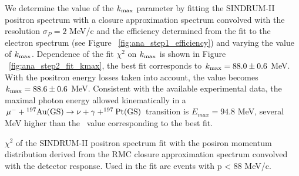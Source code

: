We determine the value of the $\mbox{$k_{\rm max}$}$ parameter by fitting the SINDRUM-II positron spectrum
with a closure approximation spectrum convolved with the resolution $\sigma_P = 2$ MeV/c
and the efficiency determined from the fit to the electron spectrum
(see Figure ~\ref{fig:ana_step1_efficiency}) and varying the value of $\mbox{$k_{\rm max}$}$.
Dependence of the fit $\chi^2$ on $\mbox{$k_{\rm max}$}$ is shown in Figure ~\ref{fig:ana_step2_fit_kmax},
the best fit corresponds to $\mbox{$k_{\rm max}$} = 88.0 \pm 0.6$ MeV.
%
With the positron energy losses taken into account, the value becomes $\mbox{$k_{\rm max}$} = 88.6 \pm 0.6$ MeV.
Consistent with the available experimental data, the maximal photon energy allowed kinematically
in a $\rm \mu^- + \mbox{$\rm ^{197}Au$}(GS) \rightarrow \nu +\gamma + ^{197}Pt(GS) $ transition
is $E_{max} = 94.8$ MeV, several MeV higher than the \kmax\ value corresponding to the best fit.
\vspace{0.1in}
 {
  \label{fig:ana_step2_fit_kmax}
  $\chi^2$ of the SINDRUM-II positron spectrum fit with the posiron momentum distribution
  derived from the RMC closure approximation spectrum convolved with the detector response. 
  Used in the fit are events with p < 88 MeV/c.
}
\vspace{0.1in}


